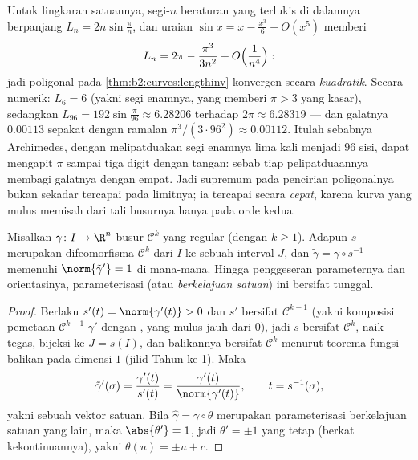 \begin{example}\label{ex:b2:curves:archimedes}
Untuk lingkaran satuannya, segi-$n$ beraturan yang terlukis di dalamnya berpanjang
$L_n = 2n\sin\frac\pi n$, dan uraian $\sin x = x -
\frac{x^3}6 + O(x^5)$ memberi
\[
L_n = 2\pi - \frac{\pi^3}{3n^2} + O\Bigl(\frac1{n^4}\Bigr) :
\]
jadi  poligonal pada \cref{thm:b2:curves:lengthinv}
konvergen secara \emph{kuadratik}. Secara numerik: $L_6 = 6$
(yakni segi enamnya, yang memberi $\pi > 3$ yang kasar), sedangkan $L_{96} =
192\sin\frac{\pi}{96} \approx 6.28206$ terhadap $2\pi \approx
6.28319$ --- dan galatnya $0.00113$ sepakat dengan ramalan
$\pi^3/(3\cdot96^2) \approx 0.00112$. Itulah sebabnya Archimedes,
dengan melipatduakan segi enamnya lima kali menjadi $96$ sisi, dapat mengapit
$\pi$ sampai tiga digit dengan tangan: sebab tiap pelipatduaannya membagi
galatnya dengan empat. Jadi supremum pada pencirian
poligonalnya bukan sekadar tercapai pada limitnya; ia
tercapai secara \emph{cepat}, karena kurva yang mulus memisah dari
tali busurnya hanya pada orde kedua.
\end{example}

\begin{theorem}\label{thm:b2:curves:arclength}
Misalkan $\gamma \colon I \to \R^n$ busur $\mathcal{C}^k$ yang regular
(dengan $k \geq 1$). Adapun  $s$ merupakan difeomorfisma
$\mathcal{C}^k$ dari $I$ ke sebuah interval $J$, dan $\tilde\gamma =
\gamma \circ s^{-1}$ memenuhi $\norm{\tilde\gamma'} = 1$
di mana-mana. Hingga penggeseran parameternya dan orientasinya,
parameterisasi \emph{} (atau \emph{berkelajuan satuan}) ini
bersifat tunggal.
\end{theorem}

\begin{proof}
Berlaku $s'(t) = \norm{\gamma'(t)} > 0$ dan $s'$ bersifat $\mathcal{C}^{k-1}$
(yakni komposisi pemetaan $\mathcal{C}^{k-1}$ $\gamma'$ dengan ,
yang mulus jauh dari $0$), jadi $s$ bersifat $\mathcal{C}^k$, naik
tegas, bijeksi ke $J = s(I)$, dan balikannya bersifat
$\mathcal{C}^k$ menurut teorema fungsi balikan pada dimensi $1$
(jilid Tahun ke-1). Maka
\[
\tilde\gamma'(\sigma)
= \frac{\gamma'(t)}{s'(t)}
= \frac{\gamma'(t)}{\norm{\gamma'(t)}},
\qquad t = s^{-1}(\sigma),
\]
yakni sebuah vektor satuan. Bila $\hat\gamma = \gamma\circ\theta$ merupakan
parameterisasi berkelajuan satuan yang lain, maka $\abs{\theta'} = 1$, jadi $\theta'
= \pm 1$ yang tetap (berkat kekontinuannya), yakni $\theta(u) = \pm u + c$.
\end{proof}


